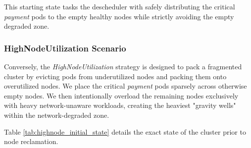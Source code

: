 This starting state tasks the descheduler with safely distributing the critical \textit{payment} pods to the empty healthy nodes while strictly avoiding the empty degraded zone.

\subsubsection{HighNodeUtilization Scenario}
\label{subsubsec:netaware4_workload_highnode}
Conversely, the \textit{HighNodeUtilization} strategy is designed to pack a fragmented cluster by evicting pods from underutilized nodes and packing them onto overutilized nodes. We place the critical \textit{payment} pods sparsely across otherwise empty nodes. We then intentionally overload the remaining nodes exclusively with heavy network-unaware workloads, creating the heaviest "gravity wells" within the network-degraded zone.

Table \ref{tab:highnode_initial_state} details the exact state of the cluster prior to node reclamation.

\begin{table}[H]
    \centering
    \caption{Resource Allocation: Initial State for HighNodeUtilization Strategy}
    \label{tab:highnode_initial_state}
\end{table}

